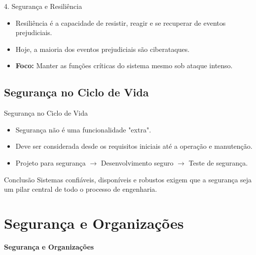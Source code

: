 \documentclass[aspectratio=169]{beamer}
\begin{document}
\begin{frame}{4. Segurança e Resiliência}
    \begin{itemize}
        \item Resiliência é a capacidade de resistir, reagir e se recuperar de eventos prejudiciais.
        \item Hoje, a maioria dos eventos prejudiciais são ciberataques.
        \item \textbf{Foco:} Manter as funções críticas do sistema mesmo sob ataque intenso.
    \end{itemize}
    \centering
\end{frame}

\subsection{Segurança no Ciclo de Vida}
\begin{frame}{Segurança no Ciclo de Vida}
    \begin{itemize}
        \item Segurança não é uma funcionalidade "extra".
        \item Deve ser considerada desde os requisitos iniciais até a operação e manutenção.
        \item Projeto para segurança $\rightarrow$ Desenvolvimento seguro $\rightarrow$ Teste de segurança.
    \end{itemize}
    \begin{exampleblock}{Conclusão}
        Sistemas confiáveis, disponíveis e robustos exigem que a segurança seja um pilar central de todo o processo de engenharia.
    \end{exampleblock}
\end{frame}

\section{Segurança e Organizações}
{
\begin{frame}[plain]
    \centering
    \Huge \color{white} \bfseries Segurança e Organizações
\end{frame}
}
\end{document}
